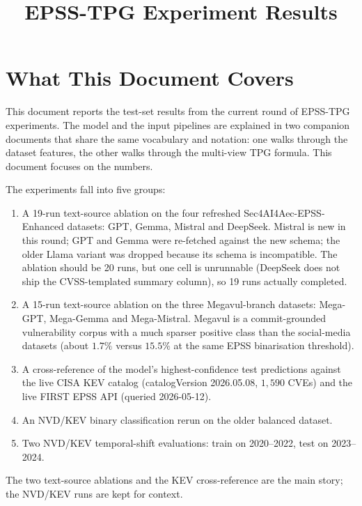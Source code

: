 \documentclass[11pt]{article}
\title{EPSS-TPG Experiment Results}
\author{}
\date{}
\begin{document}
\maketitle

\section{What This Document Covers}

This document reports the test-set results from the current round of
EPSS-TPG experiments. The model and the input pipelines are explained
in two companion documents that share the same vocabulary and
notation: one walks through the dataset features, the other walks
through the multi-view TPG formula. This document focuses on the
numbers.

The experiments fall into five groups:

\begin{enumerate}
    \item A 19-run text-source ablation on the four refreshed
    Sec4AI4Aec-EPSS-Enhanced datasets: GPT, Gemma, Mistral and DeepSeek.
    Mistral is new in this round; GPT and Gemma were re-fetched against
    the new schema; the older Llama variant was dropped because its
    schema is incompatible. The ablation should be 20 runs, but one
    cell is unrunnable (DeepSeek does not ship the CVSS-templated
    summary column), so 19 runs actually completed.
    \item A 15-run text-source ablation on the three Megavul-branch
    datasets: Mega-GPT, Mega-Gemma and Mega-Mistral. Megavul is a
    commit-grounded vulnerability corpus with a much sparser positive
    class than the social-media datasets (about $1.7\%$ versus
    $15.5\%$ at the same EPSS binarisation threshold).
    \item A cross-reference of the model's highest-confidence test
    predictions against the live CISA KEV catalog
    (catalogVersion 2026.05.08, $1{,}590$ CVEs) and the live FIRST
    EPSS API (queried 2026-05-12).
    \item An NVD/KEV binary classification rerun on the older balanced
    dataset.
    \item Two NVD/KEV temporal-shift evaluations: train on 2020--2022,
    test on 2023--2024.
\end{enumerate}

The two text-source ablations and the KEV cross-reference are the main
story; the NVD/KEV runs are kept for context.
\end{document}

